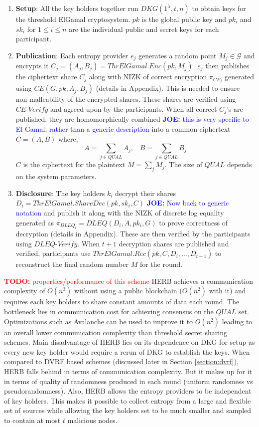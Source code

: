 \documentclass[letterpaper,twocolumn,10pt]{article}
\theoremstyle{definition}
\theoremstyle{remark}
\newcommand{\todo}[1]{\textcolor{red}{\textbf{TODO:} #1}}
\newcommand{\joenote}[1]{\textcolor{blue}{\textbf{JOE:} #1}}
\begin{document}
\begin{enumerate}
    \item \textbf{Setup}: All the key holders together run $DKG(1^\lambda, t, n)$ to obtain keys for the threshold ElGamal cryptosystem. $pk$ is the global public key and $pk_i$ and $sk_i$ for $1 \le i \le n$ are the individual public and secret keys for each participant.
    
    \item \textbf{Publication}: Each entropy provider $e_j$ generates a random point $M_j \in \mathcal{G}$ and encrypts it $C_j = (A_j, B_j) = ThrElGamal.Enc(pk, M_j)$. $e_j$ then publishes the ciphertext share $C_j$ along with NIZK of correct encryption $\pi_{CE_{j}}$ generated using $CE(G, pk, A_j, B_j)$ (details in Appendix). This is needed to ensure non-malleability of the encrypted shares. These shares are verified using $CE\text{-}Verify$ and agreed upon by the participants. When all correct $C_j$'s are published, they are homomorphically combined \joenote{this is very specific to El Gamal, rather than a generic description} into a common ciphertext $C = (A, B)$ where,
    $$ A = \sum_{j \in QUAL} A_j,\;\;\; B = \sum_{j \in QUAL} B_j$$
     $C$ is the ciphertext for the plaintext $M = \sum_{j} M_j$. The size of $QUAL$ depends on the system parameters.
    
    \item \textbf{Disclosure}: The key holders $k_i$ decrypt their shares $D_i = ThrElGamal.ShareDec(pk, sk_i, C)$ \joenote{Now back to generic notation} and publish it along with the NIZK of discrete log equality generated as $\pi_{DLEQ_{i}} = DLEQ(D_i, A, pk_i, G)$ to prove correctness of decryption (details in Appendix). These are then verified by the participants using $DLEQ\text{-}Verify$. When $t+1$ decryption shares are published and verified, participants use $ThrElGamal.Rec(pk, C, D_i, \ldots, D_{t+1})$ to reconstruct the final random number $M$ for the round.
\end{enumerate}


\todo{properties/performance of this scheme}
HERB achieves a communication complexity of $O(n^3)$ without using a public blockchain ($O(n^2)$ with it) and requires each key holders to share constant amounts of data each round. The bottleneck lies in communication cost for achieving consensus on the $QUAL$ set. Optimizations such as Avalanche \cite{rocket2018snowflake} can be used to improve it to $O(n^2)$ leading to an overall lower communication complexity than threshold secret sharing schemes. Main disadvantage of HERB lies on its dependence on DKG for setup as every new key holder would require a rerun of DKG to establish the keys. When compared to DVRF based schemes (discussed later in Section \ref{section:dvrf}), HERB falls behind in terms of communication complexity. But it makes up for it in terms of quality of randomness produced in each round (uniform randomess vs pseudorandomness). Also, HERB allows the entropy providers to be independent of key holders. This makes it possible to collect entropy from a large and flexible set of sources while allowing the key holders set to be much smaller and sampled to contain at most $t$ malicious nodes.
\end{document}
